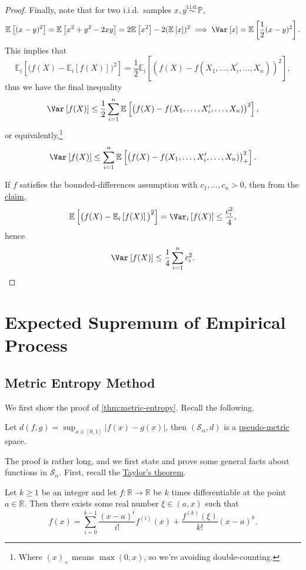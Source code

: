 \begin{proof}
	Finally, note that for two i.i.d.\ samples \(x, y \overset{\text{i.i.d.} }{\sim } \mathbb{P} \),
	\[
		\mathbb{E}_{}\left[(x-y)^2 \right] = \mathbb{E}_{}\left[x^2 + y^2 - 2xy \right] = 2 \mathbb{E}_{}\left[x^2 \right] - 2(\mathbb{E}_{}\left[x \right] )^2
		\implies \Var_{}\left[x \right] = \mathbb{E}_{}\left[\frac{1}{2}(x-y)^2 \right].
	\]
	This implies that
	\[
		\mathbb{E}_{i}\left[\big(f(X) - \mathbb{E}_{i}\left[f(X) \right] \big)^2 \right]
		= \frac{1}{2} \mathbb{E}_{i}\left[(f(X) - f(X_1, \dots , X_i^{\prime} , \dots , X_n))^2 \right] ,
	\]
	thus we have the final inequality
	\[
		\Var_{}\left[f(X) \right]
		\leq \frac{1}{2}\sum_{i=1}^{n} \mathbb{E}_{}\left[\big( f(X) - f(X_1, \dots , X_i^{\prime} , \dots , X_n) \big)^2 \right],
	\]
	or equivalently,\footnote{Where \((x)_+\) means \(\max (0, x)\), so we're avoiding double-counting.}
	\[
		\Var_{}\left[f(X) \right]
		\leq \sum_{i=1}^{n} \mathbb{E}_{}\left[\big( f(X) - f(X_1, \dots , X_i^{\prime} , \dots , X_n) \big)_+^2 \right].
	\]

	If \(f\) satisfies the bounded-differences assumption with \(c_1, \dots , c_n > 0\), then from the \hyperref[lma:variance-bound]{claim},
	\[
		\mathbb{E}_{}\left[\big(f(X) - \mathbb{E}_{i}\left[f(X) \right] \big)^2\right]
		= \Var_{i}\left[f(X) \right]
		\leq \frac{c_i^2}{4},
	\]
	hence
	\[
		\Var_{}\left[f(X) \right]
		\leq \frac{1}{4}\sum_{i=1}^{n} c_i^2.
	\]
\end{proof}

\section{Expected Supremum of Empirical Process}
\subsection{Metric Entropy Method}
We first show the proof of \autoref{thm:metric-entropy}. Recall the following.

\begin{prev}
	Let \(d(f, g) = \sup _{x\in [0, 1]} \vert f(x) - g(x) \vert \), then \((\mathcal{S} _\alpha , d)\) is a \hyperref[def:pseudo-metric]{pseudo-metric} space.
\end{prev}

The proof is rather long, and we first state and prove some general facts about functions in \(\mathcal{S} _\alpha \). First, recall the \hyperref[thm:Taylor]{Taylor's theorem}.
\begin{theorem}\label{thm:Taylor}
	Let \(k \geq 1\) be an integer and let \(f\colon \mathbb{R} \to \mathbb{R} \) be \(k\) times differentiable at the point \(a\in \mathbb{R} \). Then there exists some real number \(\xi \in (a, x)\) such that
	\[
		f(x) = \sum_{i=0}^{k-1} \frac{(x-a)^i}{i!} f^{(i)}(x) + \frac{f^{(k)}(\xi )}{k!} (x-a)^k.
	\]
\end{theorem}

